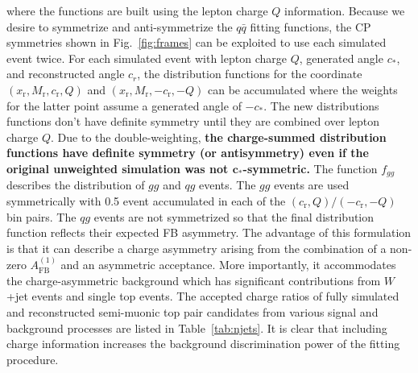 \documentclass{cmspaperpdf}
\begin{document}
where the functions are built using the lepton charge $Q$ information.  Because we desire to symmetrize and anti-symmetrize the $q\bar q$ fitting functions, the CP symmetries shown in Fig.~\ref{fig:frames} can be exploited to use each simulated event twice.  For each simulated event with lepton charge $Q$, generated angle $c_*$, and reconstructed angle $c_r$, the distribution functions for the coordinate $(x_\mathrm{r},M_\mathrm{r},c_\mathrm{r},Q)$ and $(x_\mathrm{r},M_\mathrm{r},-c_\mathrm{r},-Q)$ can be accumulated where the weights for the latter point assume a generated angle of $-c_*$.    The new distributions functions don't have definite symmetry until they are combined over lepton charge $Q$.  Due to the double-weighting, {\bf the charge-summed distribution functions have definite symmetry (or antisymmetry) even if the original unweighted simulation was not $\mathbf{c_*}$-symmetric.}  The function $f_{gg}$ describes the distribution of $gg$ and $qg$ events.  The $gg$ events are used symmetrically with 0.5 event accumulated in each of the $(c_\mathrm{r},Q)/(-c_\mathrm{r},-Q)$ bin pairs.  The $qg$ events are not symmetrized so that the final distribution function reflects their expected FB asymmetry.  The advantage of this formulation is that it can describe a charge asymmetry arising from the combination of a non-zero $A_\mathrm{FB}^{(1)}$ and an asymmetric acceptance.  More importantly, it accommodates the charge-asymmetric background which has significant contributions from $W$+jet events and single top events.  The accepted charge ratios of fully simulated and reconstructed semi-muonic top pair candidates from various signal and background processes are listed in Table~\ref{tab:njets}.  It is clear that including charge information increases the background discrimination power of the fitting procedure.
\end{document}
